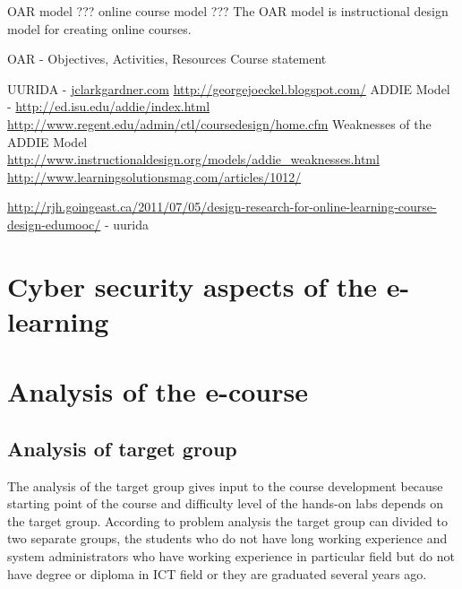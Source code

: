 {\color{red} OAR model ??? online course model ??? }
The OAR model is instructional design model for creating online courses.

OAR - Objectives, Activities, Resources
Course statement


{\color{red} UURIDA } - \url{jclarkgardner.com} \url{http://georgejoeckel.blogspot.com/}
ADDIE Model - \url{http://ed.isu.edu/addie/index.html}
\url{http://www.regent.edu/admin/ctl/coursedesign/home.cfm}
Weaknesses of the ADDIE Model \url{http://www.instructionaldesign.org/models/addie_weaknesses.html}
\url{http://www.learningsolutionsmag.com/articles/1012/}

\url{http://rjh.goingeast.ca/2011/07/05/design-research-for-online-learning-course-design-edumooc/} - uurida


\section{Cyber security aspects of the e-learning}

\section{Analysis of the e-course}
\subsection{Analysis of target group}
The analysis of the target group gives input to the course development because starting point of the course and difficulty level of the hands-on labs depends on the target group. According to problem analysis the target group can divided to two separate groups, the students who do not have long working experience and system administrators who have working experience in particular field but do not have degree or diploma in \gls{ICT} field or they are graduated several years ago.

